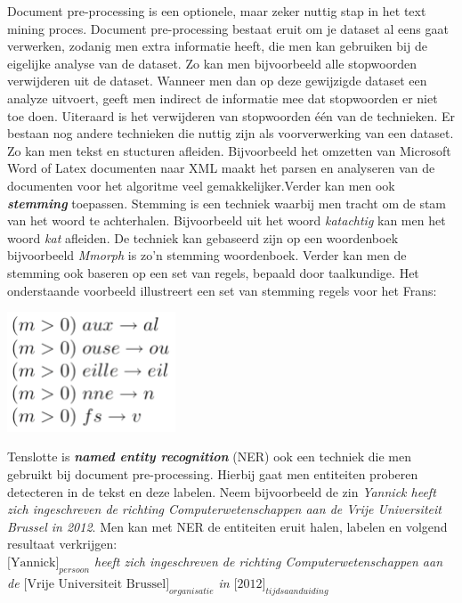 Document pre-processing is een optionele, maar zeker nuttig stap in het text mining proces. Document pre-processing bestaat eruit om je dataset al eens gaat verwerken, zodanig men extra informatie heeft, die men kan gebruiken bij de eigelijke analyse van de dataset. Zo kan men bijvoorbeeld alle stopwoorden verwijderen uit de dataset. Wanneer men dan op deze gewijzigde dataset een analyze uitvoert, geeft men indirect de informatie mee dat stopwoorden er niet toe doen. Uiteraard is het verwijderen van stopwoorden \'e\'en van de technieken.  Er bestaan nog andere technieken die nuttig zijn als voorverwerking van een dataset. Zo kan men tekst en stucturen afleiden. Bijvoorbeeld het omzetten van Microsoft Word of Latex documenten naar XML maakt het parsen en analyseren van de documenten voor het algoritme veel gemakkelijker.Verder kan men ook \textbf{\textit{stemming}} toepassen. Stemming is een techniek waarbij men tracht om de stam van het woord te achterhalen. Bijvoorbeeld uit het woord \textit{katachtig} kan men het woord \textit{kat} afleiden. De techniek kan gebaseerd zijn op een woordenboek bijvoorbeeld \textit{Mmorph} \cite{petitpierre1995mmorph} is zo'n stemming woordenboek. Verder kan men de stemming ook baseren op een set van regels, bepaald door taalkundige. Het onderstaande voorbeeld illustreert een set van stemming regels voor het Frans:
\begin{center}
  \includegraphics[width=5cm]{stemming_regels_frans}
\end{center}
Tenslotte is \textbf{\textit{named entity recognition}} (NER) ook een techniek die men gebruikt bij document pre-processing. Hierbij gaat men entiteiten proberen detecteren in de tekst en deze labelen. Neem bijvoorbeeld de zin \textit{Yannick heeft zich ingeschreven de richting Computerwetenschappen aan de Vrije Universiteit Brussel in 2012}. Men kan met NER de entiteiten eruit halen, labelen en volgend resultaat verkrijgen:\\ \textit{$\text{[Yannick]}_{persoon}$ heeft zich ingeschreven de richting Computerwetenschappen aan de $\text{[Vrije Universiteit Brussel]}_{organisatie}$ in $\text{[2012]}_{tijdsaanduiding}$}
